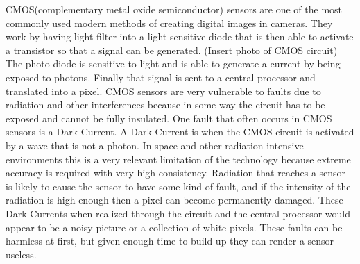 
CMOS(complementary metal oxide semiconductor) sensors are one of the most commonly used modern methods of creating digital images in cameras.  They work by having light filter into a light sensitive diode that is then able to activate a transistor so that a signal can be generated.  (Insert photo of CMOS circuit)  The photo-diode is sensitive to light and is able to generate a current by being exposed to photons.  Finally that signal is sent to a central processor and translated into a pixel.  CMOS sensors are very vulnerable to faults due to radiation and other interferences because in some way the circuit has to be exposed and cannot be fully insulated.  One fault that often occurs in CMOS sensors is a Dark Current.  A Dark Current is when the CMOS circuit is activated by a wave that is not a photon.  In space and other radiation intensive environments this is a very relevant limitation of the technology because extreme accuracy is required with very high consistency.  Radiation that reaches a sensor is likely to cause the sensor to have some kind of fault, and if the intensity of the radiation is high enough then a pixel can become permanently damaged.  These Dark Currents when realized through the circuit and the central processor would appear to be a noisy picture or a collection of white pixels.  These faults can be harmless at first, but given enough time to build up they can render a sensor useless.
